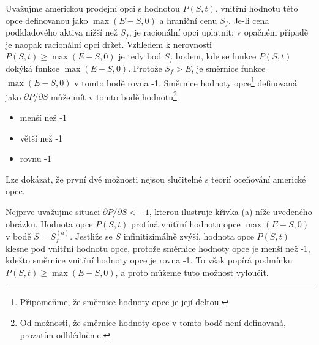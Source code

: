 \documentclass[a4paper]{book}
\begin{document}
Uvažujme americkou prodejní opci s hodnotou $P(S,t)$, vnitřní hodnotu této opce definovanou jako $\max(E - S, 0)$ a hraniční cenu $S_f$. Je-li cena podkladového aktiva nižší než $S_f$, je racionální opci uplatnit; v opačném případě je naopak racionální opci držet. Vzhledem k nerovnosti $P(S,t) \ge \max(E - S, 0)$ je tedy bod $S_f$ bodem, kde se funkce $P(S,t)$ dokýká funkce $\max(E - S, 0)$. Protože $S_f > E$, je směrnice funkce $\max(E - S, 0)$ v tomto bodě rovna -1. Směrnice hodnoty opce\footnote{Připomeňme, že směrnice hodnoty opce je její deltou.} definovaná jako $\partial P / \partial S$ může mít v tomto bodě hodnotu\footnote{Od možnosti, že směrnice hodnoty opce v tomto bodě není definovaná, prozatím odhlédněme.}
\begin{itemize}
\item menší než -1
\item větší než -1
\item rovnu -1
\end{itemize}
Lze dokázat, že první dvě možnosti nejsou slučitelné s teorií oceňování americké opce.

Nejprve uvažujme situaci $\partial P / \partial S < -1$, kterou ilustruje křivka (a) níže uvedeného obrázku. Hodnota opce $P(S,t)$ protíná vnitřní hodnotu opce $\max(E - S, 0)$ v bodě $S = S_f^{(a)}$. Jestliže se $S$ infinitizimálně zvýší, hodnota opce $P(S,t)$ klesne pod vnitřní hodnotu opce, protože směrnice hodnoty opce je menší než -1, kdežto směrnice vnitřní hodnoty opce je rovna -1. To však popírá podmínku $P(S,t) \ge \max(E - S, 0)$, a proto můžeme tuto možnost vyloučit.
\end{document}
